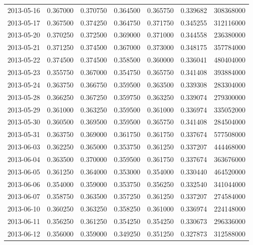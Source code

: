 \begin{tabular}{lrrrrrr}
2013-05-16 &    0.367000 &    0.370750 &    0.364500 &    0.365750 &    0.339682 &   308368000 \\
2013-05-17 &    0.367500 &    0.374250 &    0.364750 &    0.371750 &    0.345255 &   312116000 \\
2013-05-20 &    0.370250 &    0.372500 &    0.369000 &    0.371000 &    0.344558 &   236380000 \\
2013-05-21 &    0.371250 &    0.374500 &    0.367000 &    0.373000 &    0.348175 &   357784000 \\
2013-05-22 &    0.374500 &    0.374500 &    0.358500 &    0.360000 &    0.336041 &   480404000 \\
2013-05-23 &    0.355750 &    0.367000 &    0.354750 &    0.365750 &    0.341408 &   393884000 \\
2013-05-24 &    0.363750 &    0.366750 &    0.359500 &    0.363500 &    0.339308 &   283304000 \\
2013-05-28 &    0.366250 &    0.367250 &    0.359750 &    0.363250 &    0.339074 &   279300000 \\
2013-05-29 &    0.361000 &    0.363250 &    0.359500 &    0.361000 &    0.336974 &   335052000 \\
2013-05-30 &    0.360500 &    0.369500 &    0.359500 &    0.365750 &    0.341408 &   284504000 \\
2013-05-31 &    0.363750 &    0.369000 &    0.361750 &    0.361750 &    0.337674 &   577508000 \\
2013-06-03 &    0.362250 &    0.365000 &    0.353750 &    0.361250 &    0.337207 &   444468000 \\
2013-06-04 &    0.363500 &    0.370000 &    0.359500 &    0.361750 &    0.337674 &   363676000 \\
2013-06-05 &    0.361250 &    0.364000 &    0.353000 &    0.354000 &    0.330440 &   464520000 \\
2013-06-06 &    0.354000 &    0.359000 &    0.353750 &    0.356250 &    0.332540 &   341044000 \\
2013-06-07 &    0.358750 &    0.363500 &    0.357250 &    0.361250 &    0.337207 &   274584000 \\
2013-06-10 &    0.360250 &    0.363250 &    0.358250 &    0.361000 &    0.336974 &   224148000 \\
2013-06-11 &    0.356250 &    0.361250 &    0.354250 &    0.354250 &    0.330673 &   296336000 \\
2013-06-12 &    0.356000 &    0.359000 &    0.349250 &    0.351250 &    0.327873 &   312588000 \\

\end{tabular}

